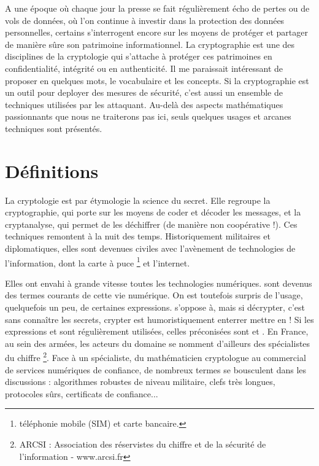 

A une époque où chaque jour la presse se fait régulièrement écho de pertes ou de vols de données, où l'on continue à investir dans la  protection des données personnelles, certains s'interrogent encore sur les moyens de protéger et partager de manière sûre son patrimoine informationnel. La cryptographie est une des disciplines de la cryptologie qui s'attache à protéger ces patrimoines en confidentialité, intégrité ou en authenticité. Il me paraissait intéressant de proposer en quelques mots,  le vocabulaire et les concepts. Si la cryptographie est un outil pour deployer des mesures de sécurité, c'est aussi un ensemble de techniques utilisées par les attaquant.  Au-delà des aspects mathématiques passionnants que nous ne traiterons pas ici,  seuls quelques usages et arcanes techniques sont présentés.

\section{Définitions}

 La cryptologie est par étymologie la science du secret. Elle regroupe la cryptographie, qui porte sur les moyens de coder et décoder les messages, et la cryptanalyse, qui permet de les déchiffrer (de manière non coopérative !).
Ces techniques remontent à la nuit des temps. Historiquement militaires et diplomatiques, elles sont devenues civiles avec l'avènement de technologies de l'information, dont la carte à puce \footnote{téléphonie mobile (SIM) et carte bancaire.} et l'internet.

Elles ont envahi à grande vitesse toutes les technologies numériques. sont devenus des termes courants de cette vie numérique. On est toutefois surpris de l'usage, quelquefois un peu, de certaines expressions. s'oppose à, mais si décrypter, c'est sans connaître les secrets, crypter est humoristiquement enterrer  mettre en ! Si les expressions et sont régulièrement utilisées, celles préconisées sont  et . En France, au sein des armées, les acteurs du domaine se nomment d'ailleurs des spécialistes du chiffre \footnote{ARCSI : Association des réservistes du chiffre et de la sécurité de l'information - www.arcsi.fr}. Face à un spécialiste, du mathématicien cryptologue au commercial de services numériques de confiance, de nombreux termes se bousculent dans les discussions : algorithmes robustes de niveau militaire, clefs très longues, protocoles sûrs, certificats de confiance...

